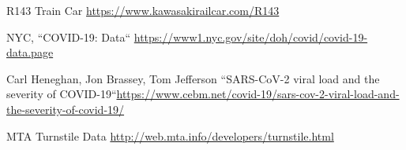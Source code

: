 \documentclass[12pt]{article}
\begin{document}
\begin{thebibliography}{00}
 R143 Train Car \url{https://www.kawasakirailcar.com/R143}

 NYC, ``COVID-19: Data`` \url{https://www1.nyc.gov/site/doh/covid/covid-19-data.page}

 Carl Heneghan, Jon Brassey, Tom Jefferson ``SARS-CoV-2 viral load and the severity of COVID-19``\url{https://www.cebm.net/covid-19/sars-cov-2-viral-load-and-the-severity-of-covid-19/}


 MTA Turnstile Data \url{http://web.mta.info/developers/turnstile.html}

\end{thebibliography}
\end{document}
